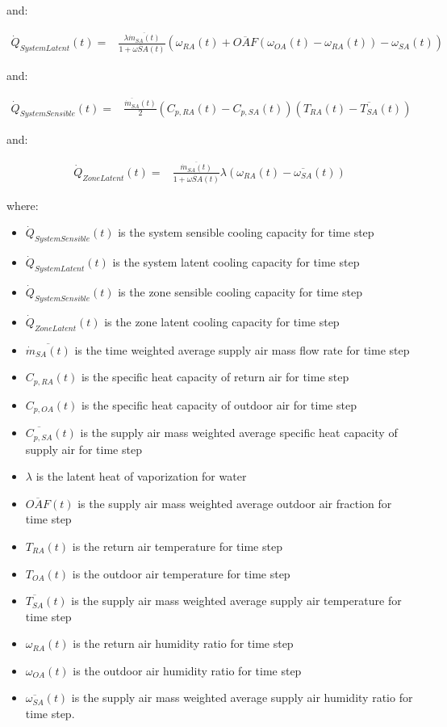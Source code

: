 and:

\begin{align}
	\dot{Q}_{SystemLatent}(t) = & \frac{\lambda\overline{\dot{m}_{SA}(t)}}{1+\overline{\omega{SA}}(t)}\left(\omega_{RA}(t)+\overline{OAF}\left(\omega_{OA}(t)-\omega_{RA}(t)\right)-\omega_{SA}(t)\right)
\end{align}

and:

\begin{align}
	\dot{Q}_{SystemSensible}(t) = & \frac{\overline{\dot{m}_{SA}}(t)}{2}\left(C_{p,RA}(t)-C_{p,SA}(t)\right)\left(T_{RA}(t)-\overline{T_{SA}}(t)\right)
\end{align}

and:

\begin{align}
	\dot{Q}_{ZoneLatent}(t) = & \frac{\overline{\dot{m}_{SA}(t)}}{1+\overline{\omega{SA}}(t)}\lambda\left(\omega_{RA}(t)-\overline{\omega_{SA}}(t)\right)
\end{align}

where:
\begin{itemize}
\item $\dot{Q}_{SystemSensible}(t)$ is the system sensible cooling capacity for time step
\item $\dot{Q}_{SystemLatent}(t)$ is the system latent cooling capacity for time step
\item $\dot{Q}_{SystemSensible}(t)$ is the zone sensible cooling capacity for time step
\item $\dot{Q}_{ZoneLatent}(t)$ is the zone latent cooling capacity for time step
\item $\overline{\dot{m}_{SA}(t)}$ is the time weighted average supply air mass flow rate for time step
\item $C_{p,RA}(t)$ is the specific heat capacity of return air for time step
\item $C_{p,OA}(t)$ is the specific heat capacity of outdoor air for time step
\item $\overline{C_{p,SA}}(t)$ is the supply air mass weighted average specific heat capacity of supply air for time step
\item $\lambda$ is the latent heat of vaporization for water
\item $\overline{OAF}(t)$ is the supply air mass weighted average outdoor air fraction for time step
\item $T_{RA}(t)$ is the return air temperature for time step
\item $T_{OA}(t)$ is the outdoor air temperature for time step
\item $\overline{T_{SA}}(t)$ is the supply air mass weighted average supply air temperature for time step
\item $\omega_{RA}(t)$ is the return air humidity ratio for time step
\item $\omega_{OA}(t)$ is the outdoor air humidity ratio for time step
\item $\overline{\omega_{SA}}(t)$ is the supply air mass weighted average supply air humidity ratio for time step.
\end{itemize}

